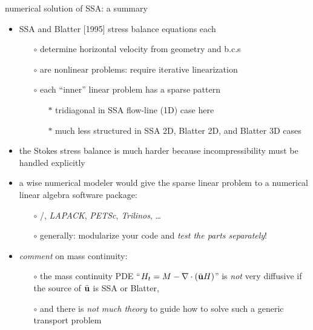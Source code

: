 \begin{frame}{numerical solution of SSA: a summary}

\begin{itemize}
\item SSA and Blatter [1995]\nocite{Blatter} stress balance equations each
   \begin{itemize}
   \item[$\circ$]  determine horizontal velocity from geometry and b.c.s
   \item[$\circ$]  are nonlinear problems: require iterative linearization
   \item[$\circ$]  each ``inner'' linear problem has a sparse pattern
      \begin{itemize}
      \item[$\ast$] tridiagonal in SSA flow-line (1D) case here
      \item[$\ast$] much less structured in SSA 2D, Blatter 2D, and Blatter 3D cases
      \end{itemize}
   \end{itemize}
\item the Stokes stress balance is much harder because incompressibility must be handled explicitly
\item a wise numerical modeler would give the sparse linear problem to a numerical linear algebra software package:
  \begin{itemize}
  \item[$\circ$]  \Matlab/\Octave, \emph{LAPACK}, \emph{PETSc}, \emph{Trilinos}, \dots
  \item[$\circ$]  generally: modularize your code and \emph{test the parts separately}!
  \end{itemize}
\item \emph{comment} on mass continuity:  
  \begin{itemize}
  \item[$\circ$]  the mass continuity PDE ``$H_t = M - \nabla\cdot\left(\bar {\mathbf{u}} H\right)$'' is \emph{not} very diffusive if the source of $\bar {\mathbf{u}}$ is SSA or Blatter,
  \item[$\circ$]  and there is \emph{not much theory} to guide how to solve such a generic transport problem
  \end{itemize}
\end{itemize}
\end{frame}



